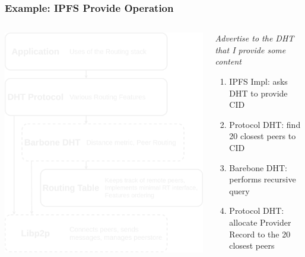 \documentclass{../pl-slide}
\begin{document}
\begin{frame}
\frametitle{Example: IPFS Provide Operation}

\begin{columns}[onlytextwidth]
	\begin{column}{0.44\textwidth}
	    		\begin{center}
        		\includegraphics[scale=.14]{resources/composable-dht-stack.png}\\
        		\end{center}
	\end{column}
	\begin{column}{0.55\textwidth}
		\textit{Advertise to the DHT that I provide some content}
		\bigskip
		\begin{enumerate}
			\item IPFS Impl: asks DHT to provide CID
			\item Protocol DHT: find 20 closest peers to CID
			\item Barebone DHT: performs recursive query
			\item Protocol DHT: allocate Provider Record to the 20 closest peers
		\end{enumerate}
	\end{column}

\end{columns}
\end{frame}
\end{document}
